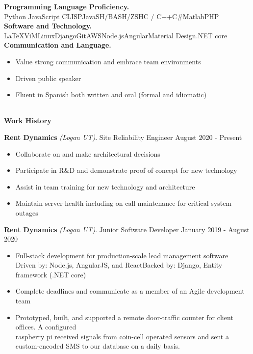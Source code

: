 \documentclass[letterpaper,11pt]{article}
\begin{document}
\textbf{Programming Language Proficiency.} \\
Python \hfill JavaScript \hfill CLISP\hfill Java\hfill SH/BASH/ZSH\hfill C / C++\hfill C\#\hfill Matlab\hfill PHP\\

\textbf{Software and Technology.}\\
\LaTeX\hfill ViM\hfill Linux\hfill Django\hfill Git\hfill AWS\hfill Node.js\hfill Angular\hfill Material Design\hfill .NET core\\

\noindent\textbf{Communication and Language.}
\begin{itemize}[noitemsep,topsep=0pt]
	\item Value strong communication and embrace team environments
	\item Driven public speaker
	\item Fluent in Spanish both written and oral (formal and idiomatic)
\end{itemize}


\begin{Large}\textbf{\\Work History}\end{Large}

\textbf{Rent Dynamics} \textit{(Logan UT)}. Site Reliability Engineer \hfill August 2020 - Present
\begin{itemize}[noitemsep,topsep=0pt]
	\item Collaborate on and make architectural decisions
	\item Participate in R\&D and demonstrate proof of concept for new technology
	\item Assist in team training for new technology and architecture
	\item Maintain server health including on call maintenance for critical system outages\\
\end{itemize}

\textbf{Rent Dynamics} \textit{(Logan UT)}. Junior Software Developer \hfill January 2019 - August 2020
\begin{itemize}[noitemsep,topsep=0pt]
	\item Full-stack development for production-scale lead management software\\ Driven by: Node.js, AngularJS, and React\qquad\quad Backed by: Django, Entity framework (.NET core)
	\item Complete deadlines and communicate as a member of an Agile development team
	\item Prototyped, built, and supported a remote door-traffic counter for client offices. A configured\\raspberry pi received signals from coin-cell operated sensors and sent a custom-encoded SMS to our database on a daily basis.\\
\end{itemize}
\end{document}
